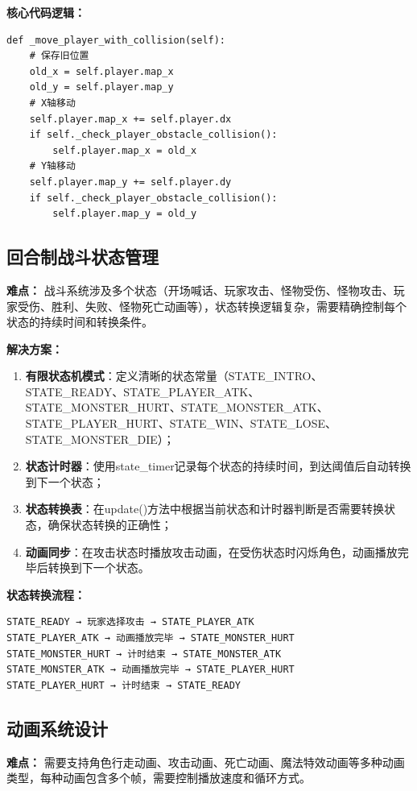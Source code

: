 \documentclass[a4paper,12pt]{article}
\begin{document}
\textbf{核心代码逻辑：}
\begin{verbatim}
def _move_player_with_collision(self):
    # 保存旧位置
    old_x = self.player.map_x
    old_y = self.player.map_y
    # X轴移动
    self.player.map_x += self.player.dx
    if self._check_player_obstacle_collision():
        self.player.map_x = old_x
    # Y轴移动
    self.player.map_y += self.player.dy
    if self._check_player_obstacle_collision():
        self.player.map_y = old_y
\end{verbatim}

\subsection{回合制战斗状态管理}

\textbf{难点：}
战斗系统涉及多个状态（开场喊话、玩家攻击、怪物受伤、怪物攻击、玩家受伤、胜利、失败、怪物死亡动画等），状态转换逻辑复杂，需要精确控制每个状态的持续时间和转换条件。

\textbf{解决方案：}
\begin{enumerate}[label=(\arabic*)]
    \item \textbf{有限状态机模式}：定义清晰的状态常量（STATE\_INTRO、STATE\_READY、STATE\_PLAYER\_ATK、STATE\_MONSTER\_HURT、STATE\_MONSTER\_ATK、STATE\_PLAYER\_HURT、STATE\_WIN、STATE\_LOSE、STATE\_MONSTER\_DIE）；
    \item \textbf{状态计时器}：使用state\_timer记录每个状态的持续时间，到达阈值后自动转换到下一个状态；
    \item \textbf{状态转换表}：在update()方法中根据当前状态和计时器判断是否需要转换状态，确保状态转换的正确性；
    \item \textbf{动画同步}：在攻击状态时播放攻击动画，在受伤状态时闪烁角色，动画播放完毕后转换到下一个状态。
\end{enumerate}

\textbf{状态转换流程：}
\begin{verbatim}
STATE_READY → 玩家选择攻击 → STATE_PLAYER_ATK
STATE_PLAYER_ATK → 动画播放完毕 → STATE_MONSTER_HURT
STATE_MONSTER_HURT → 计时结束 → STATE_MONSTER_ATK
STATE_MONSTER_ATK → 动画播放完毕 → STATE_PLAYER_HURT
STATE_PLAYER_HURT → 计时结束 → STATE_READY
\end{verbatim}

\subsection{动画系统设计}

\textbf{难点：}
需要支持角色行走动画、攻击动画、死亡动画、魔法特效动画等多种动画类型，每种动画包含多个帧，需要控制播放速度和循环方式。
\end{document}
